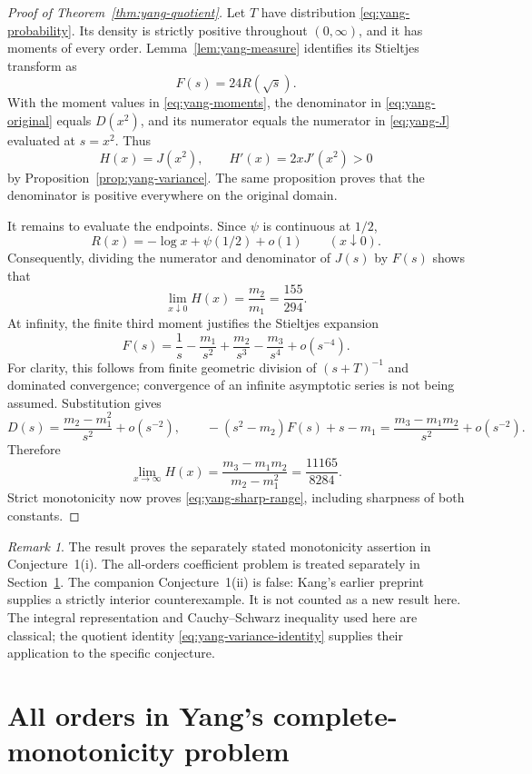 \documentclass[11pt,a4paper]{article}
\theoremstyle{definition}
\theoremstyle{remark}
\newtheorem{remark}[theorem]{Remark}
\numberwithin{equation}{section}
\begin{document}
\begin{proof}[Proof of Theorem~\ref{thm:yang-quotient}]
Let $T$ have distribution \eqref{eq:yang-probability}. Its density is
strictly positive throughout $(0,\infty)$, and it has moments of every
order. Lemma~\ref{lem:yang-measure} identifies its Stieltjes transform as
\[
 F(s)=24R(\sqrt s).
\]
With the moment values in \eqref{eq:yang-moments}, the denominator in
\eqref{eq:yang-original} equals $D(x^2)$, and its numerator equals the
numerator in \eqref{eq:yang-J} evaluated at $s=x^2$. Thus
\[
 H(x)=J(x^2),\qquad H'(x)=2xJ'(x^2)>0
\]
by Proposition~\ref{prop:yang-variance}. The same proposition proves that
the denominator is positive everywhere on the original domain.

It remains to evaluate the endpoints. Since $\psi$ is continuous at
$1/2$,
\[
 R(x)=-\log x+\psi(1/2)+o(1)\qquad(x\downarrow0).
\]
Consequently, dividing the numerator and denominator of $J(s)$ by
$F(s)$ shows that
\[
 \lim_{x\downarrow0}H(x)=\frac{m_2}{m_1}=\frac{155}{294}.
\]
At infinity, the finite third moment justifies the Stieltjes expansion
\[
 F(s)=\frac1s-\frac{m_1}{s^2}+\frac{m_2}{s^3}
                         -\frac{m_3}{s^4}+o(s^{-4}).
\]
For clarity, this follows from finite geometric division of
$(s+T)^{-1}$ and dominated convergence; convergence of an infinite
asymptotic series is not being assumed. Substitution gives
\[
 D(s)=\frac{m_2-m_1^2}{s^2}+o(s^{-2}),\qquad
 -(s^2-m_2)F(s)+s-m_1
       =\frac{m_3-m_1m_2}{s^2}+o(s^{-2}).
\]
Therefore
\[
 \lim_{x\to\infty}H(x)
 =\frac{m_3-m_1m_2}{m_2-m_1^2}
 =\frac{11165}{8284}.
\]
Strict monotonicity now proves \eqref{eq:yang-sharp-range}, including
sharpness of both constants.
\end{proof}

\begin{remark}\label{rem:yang-scope}
The result proves the separately stated monotonicity assertion in
Conjecture~1(i). The all-orders coefficient problem is treated separately
in Section~\ref{sec:yang-allorders}. The companion Conjecture~1(ii) is
false: Kang's earlier preprint \cite{Kang2026} supplies a strictly interior
counterexample. It is not counted as a new result here. The integral representation and Cauchy--Schwarz
inequality used here are classical; the quotient identity
\eqref{eq:yang-variance-identity} supplies their application to the
specific conjecture.
\end{remark}


\section{All orders in Yang's complete-monotonicity problem}
\label{sec:yang-allorders}
\end{document}
